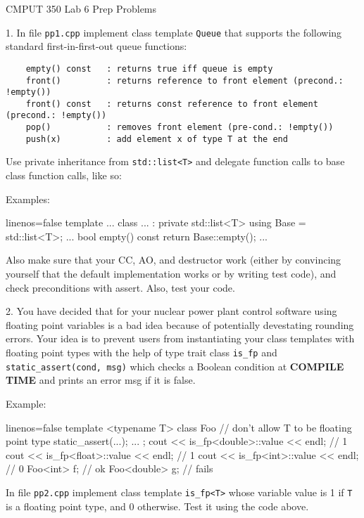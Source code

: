 \documentclass[a4paper,11pt]{article}
\begin{document}

\begin{center}
{\Large CMPUT 350 Lab 6 Prep Problems}
\end{center}


\linerule

1. In file \texttt{pp1.cpp} implement class template \texttt{Queue} that supports the 
following standard first-in-first-out queue functions:
{\small 
\begin{verbatim}
    empty() const   : returns true iff queue is empty
    front()         : returns reference to front element (precond.: !empty())
    front() const   : returns const reference to front element (precond.: !empty())
    pop()           : removes front element (pre-cond.: !empty())
    push(x)         : add element x of type T at the end
\end{verbatim}
}

Use private inheritance from \texttt{std::list<T>} and delegate function calls to base
class function calls, like so:


\bigskip 
Examples:
\begin{cppcode*}{linenos=false}
template ...
class ...
    : private std::list<T>
{
    using Base = std::list<T>;
    ...
    bool empty() const {
        return Base::empty();
    }
    ...
}
\end{cppcode*}

Also make sure that your CC, AO, and destructor work (either by convincing
yourself that the default implementation works or by writing test code), and
check preconditions with assert. Also, test your code.

\linerule 

2. You have decided that for your nuclear power plant control software using
floating point variables is a bad idea because of potentially devestating
rounding errors. Your idea is to prevent users from instantiating your
class templates with floating point types with the help of type trait
class \texttt{is\_fp} and \texttt{static\_assert(cond, msg)} which checks a
Boolean condition at \textbf{COMPILE TIME} and prints an error msg if it is false.

\medskip 
Example:
\begin{cppcode*}{linenos=false}
template <typename T> 
class Foo {
    // don't allow T to be floating point type
    static_assert(...);
    ...
};
cout << is_fp<double>::value << endl;   // 1
cout << is_fp<float>::value << endl;    // 1
cout << is_fp<int>::value << endl;      // 0
Foo<int> f;         // ok
Foo<double> g;      // fails
\end{cppcode*}

In file \texttt{pp2.cpp} implement class template \texttt{is\_fp<T>} whose
variable value is 1 if \texttt{T} is a floating point type, and 0
otherwise. Test it using the code above.
\end{document}
